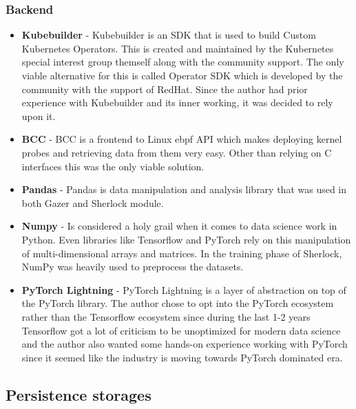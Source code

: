 \subsubsection{Backend}
\begin{itemize}
    \item \textbf{Kubebuilder} - Kubebuilder is an SDK that is used to build Custom Kubernetes Operators. This is created and maintained by the Kubernetes special interest group themself along with the community support. The only viable alternative for this is called Operator SDK which is developed by the community with the support of RedHat. Since the author had prior experience with Kubebuilder and its inner working, it was decided to rely upon it.
    \item \textbf{BCC} - BCC is a frontend to Linux \ac{ebpf} API which makes deploying kernel probes and retrieving data from them very easy. Other than relying on C interfaces this was the only viable solution. 
    \item \textbf{Pandas} - Pandas is data  manipulation and analysis library that was used in both Gazer and Sherlock module.
    \item \textbf{Numpy} - Is considered a holy grail when it comes to data science work in Python. Even libraries like Tensorflow and PyTorch rely on this manipulation of multi-dimensional arrays and matrices. In the training phase of Sherlock, NumPy was heavily used to preprocess the datasets.
    \item \textbf{PyTorch Lightning} - PyTorch Lightning is a layer of abstraction on top of the PyTorch library. The author chose to opt into the PyTorch ecosystem rather than the Tensorflow ecosystem since during the last 1-2 years Tensorflow got a lot of criticism to be unoptimized for modern data science and the author also wanted some hands-on experience working with PyTorch since it seemed like the industry is moving towards PyTorch dominated era.
\end{itemize}

\subsection{Persistence storages}

